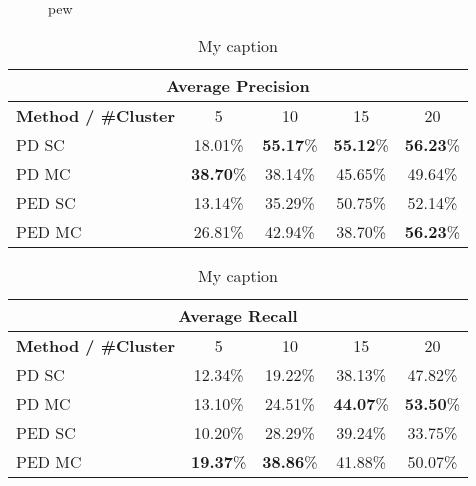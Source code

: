 %
\begin{figure}[H]
\begin{center}

~
\end{center}
\caption[Chair 3 Cast Winner]{pew}
\label{fig:chair_3_cast_best_f_score_results_merged}
\end{figure}

\begin{table}[H]
\centering
\begin{tabular}{|l|c|c|c|c|}
\hline
\multicolumn{5}{|c|}{Average Precision} \\ \hline
\textbf{Method / \#Cluster} & 5 & 10 & 15 & 20 \\ \hline
PD SC & 18.01\% & \textbf{55.17}\% & \textbf{55.12}\% & \textbf{56.23}\% \\ \hline
PD MC & \textbf{38.70}\% & 38.14\% & 45.65\% & 49.64\% \\ \hline
PED SC & 13.14\% & 35.29\% & 50.75\% & 52.14\%  \\ \hline
PED MC & 26.81\% & 42.94\% & 38.70\% & \textbf{56.23}\% \\ \hline
\end{tabular}
\caption[Chair 3 Cast: Average Precision Scores]{My caption}
\label{tab:chair_3_cast_avg_precision}
\end{table}

\begin{table}[H]
\centering
\begin{tabular}{|l|c|c|c|c|}
\hline
\multicolumn{5}{|c|}{Average Recall} \\ \hline
\textbf{Method / \#Cluster} & 5 & 10 & 15 & 20 \\ \hline
PD SC & 12.34\% & 19.22\% & 38.13\% & 47.82\% \\ \hline
PD MC & 13.10\% & 24.51\% & \textbf{44.07}\% & \textbf{53.50}\% \\ \hline
PED SC & 10.20\% & 28.29\% & 39.24\% & 33.75\% \\ \hline
PED MC & \textbf{19.37}\% & \textbf{38.86}\% & 41.88\% & 50.07\% \\ \hline
\end{tabular}
\caption[Chair 3 Cast: Average Recall Scores]{My caption}
\label{tab:chair_3_cast_avg_recall}
\end{table}

